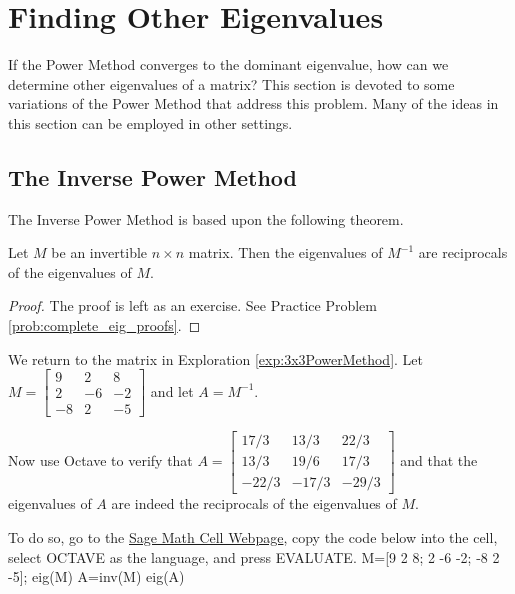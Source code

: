 \documentclass{ximera}
\begin{document}
\section*{Finding Other Eigenvalues}

If the Power Method converges to the dominant eigenvalue, how can we determine other eigenvalues of a matrix?  This section is devoted to some variations of the Power Method that address this problem.  Many of the ideas in this section can be employed in other settings.

\subsection*{The Inverse Power Method}

The Inverse Power Method is based upon the following theorem.

\begin{theorem}\label{th:eig_inverse}
Let $M$ be an invertible $n \times n$ matrix.  Then the eigenvalues of $M^{-1}$ are reciprocals of the eigenvalues of $M$.
\end{theorem}

\begin{proof}
The proof is left as an exercise.  See Practice Problem \ref{prob:complete_eig_proofs}.
\end{proof}

We return to the matrix in Exploration \ref{exp:3x3PowerMethod}.  Let $M=\left[ \begin{array}{rrr}
9 & 2 & 8 \\
2 & -6 & -2 \\
-8 & 2 & -5
\end{array}\right]$ and let $A=M^{-1}$.  

Now use Octave to verify that $A=\left[ \begin{array}{rrr}
17/3 & 13/3 & 22/3 \\
13/3 & 19/6 & 17/3 \\
-22/3 & -17/3 & -29/3
\end{array}\right]$ and that the eigenvalues of $A$ are indeed the reciprocals of the eigenvalues of $M$.

To do so, go to the \href{https://sagecell.sagemath.org/}{Sage Math Cell Webpage}, copy the code below into the cell, select OCTAVE as the language, and press EVALUATE.
M=[9 2 8; 2 -6 -2; -8 2 -5];
eig(M)
A=inv(M)
eig(A)
\end{document}

